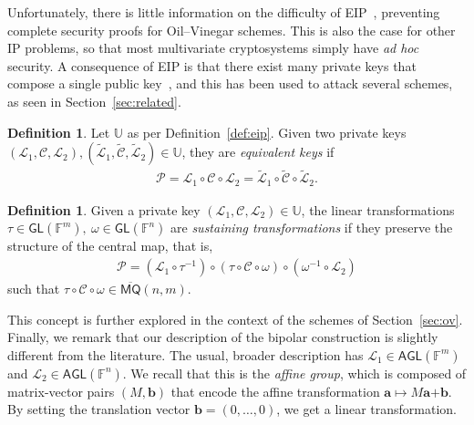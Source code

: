 \documentclass[12pt, a4paper, oneside]{memoir}
\theoremstyle{definition}
\newtheorem{definition}[theorem]{Definition}
\begin{document}
Unfortunately, there is little information on the difficulty of EIP~\cite[p.~69]{Thomae:201306}, preventing complete security proofs for Oil--Vinegar schemes. This is also the case for other IP problems, so that most multivariate cryptosystems simply have \emph{ad hoc} security. A consequence of EIP is that there exist many private keys that compose a single public key~\cite{Wolf:201104}, and this has been used to attack several schemes, as seen in Section~\ref{sec:related}.

\begin{definition}
  Let $\mathbb{U}$ as per Definition~\ref{def:eip}. Given two private keys $(\mathcal{L}_{1}, \mathcal{C}, \mathcal{L}_{2}), (\widetilde{\mathcal{L}}_{1}, \widetilde{\mathcal{C}}, \widetilde{\mathcal{L}}_{2}) \in \mathbb{U}$, they are \emph{equivalent keys} if
  \begin{align}
    \mathcal{P} = \mathcal{L}_{1} \circ \mathcal{C} \circ \mathcal{L}_{2}
      = \widetilde{\mathcal{L}}_{1} \circ \widetilde{\mathcal{C}} \circ \widetilde{\mathcal{L}}_{2}.
  \end{align}
\end{definition}

\begin{definition}\label{def:sustainer}
  Given a private key $(\mathcal{L}_{1}, \mathcal{C}, \mathcal{L}_{2}) \in \mathbb{U}$, the linear transformations $\tau \in \mathsf{GL}(\mathbb{F}^{m}),\: \omega \in \mathsf{GL}(\mathbb{F}^{n})$ are \emph{sustaining transformations} if they preserve the structure of the central map, that is,
  \begin{align}
    \mathcal{P} = (\mathcal{L}_{1} \circ \tau^{-1}) \circ (\tau \circ \mathcal{C} \circ \omega) \circ (\omega^{-1} \circ \mathcal{L}_{2})
  \end{align}
  such that $\tau \circ \mathcal{C} \circ \omega \in \overline{\mathsf{MQ}}(n, m)$.
\end{definition}

This concept is further explored in the context of the schemes of Section~\ref{sec:ov}. Finally, we remark that our description of the bipolar construction is slightly different from the literature. The usual, broader description has $\mathcal{L}_{1} \in \mathsf{AGL}(\mathbb{F}^{m})$ and $\mathcal{L}_{2} \in \mathsf{AGL}(\mathbb{F}^{n})$. We recall that this is the \emph{affine group}, which is composed of matrix-vector pairs $(M, \mathbf{b})$ that encode the affine transformation $\mathbf{a} \mapsto M\mathbf{a} \bm{+} \mathbf{b}$. By setting the translation vector $\mathbf{b} = (0, \dots, 0)$, we get a linear transformation. 
\end{document}
